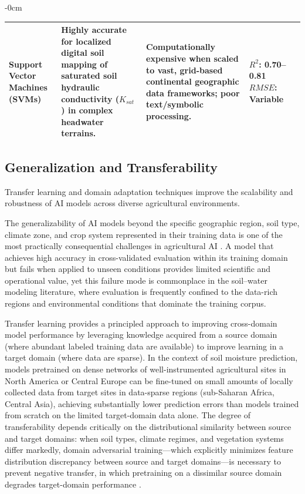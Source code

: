 \documentclass[land,review,accept,pdftex,oneauthor]{Definitions/mdpi}
\begin{document}
\begin{table}[H]
\begin{adjustwidth}{-\extralength}{0cm}
\begin{minipage}{\fulllength}
\begin{tabularx}{\textwidth}{m{3cm}<{\raggedright}m{4.5cm}<{\raggedright}m{4.4cm}<{\raggedright}m{3cm}<{\raggedright}m{1.5cm}<{\raggedright}}
Support Vector Machines (SVMs) & 
Highly accurate for localized digital soil mapping of saturated soil hydraulic conductivity ($K_{sat}$) in complex headwater terrains. & 
Computationally expensive when scaled to vast, grid-based continental geographic data frameworks; poor text/symbolic processing. & 
$R^2$: 0.70--0.81\newline $RMSE$: Variable & 
\citep{MDPIReview2025} \\

\bottomrule
\end{tabularx}
\end{minipage}
\end{adjustwidth}
\end{table}

\subsection{Generalization and Transferability}

Transfer learning and domain adaptation techniques improve the scalability and robustness of AI models across diverse agricultural environments.

The generalizability of AI models beyond the specific geographic region, soil type, climate zone, and crop system represented in their training data is one of the most practically consequential challenges in agricultural AI \citep{Reichstein2019}. A model that achieves high accuracy in cross-validated evaluation within its training domain but fails when applied to unseen conditions provides limited scientific and operational value, yet this failure mode is commonplace in the soil--water modeling literature, where evaluation is frequently confined to the data-rich regions and environmental conditions that dominate the training corpus.

Transfer learning provides a principled approach to improving cross-domain model performance by leveraging knowledge acquired from a source domain (where abundant labeled training data are available) to improve learning in a target domain (where data are sparse). In the context of soil moisture prediction, models pretrained on dense networks of well-instrumented agricultural sites in North America or Central Europe can be fine-tuned on small amounts of locally collected data from target sites in data-sparse regions (sub-Saharan Africa, Central Asia), achieving substantially lower prediction errors than models trained from scratch on the limited target-domain data alone. The degree of transferability depends critically on the distributional similarity between source and target domains: when soil types, climate regimes, and vegetation systems differ markedly, domain adversarial training---which explicitly minimizes feature distribution discrepancy between source and target domains---is necessary to prevent negative transfer, in which pretraining on a dissimilar source domain degrades target-domain performance \citep{pan2010survey}.
\end{document}
